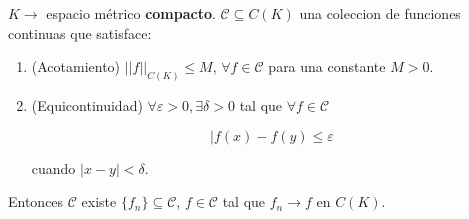 \begin{ftheorem}
   $K\rightarrow$ espacio métrico \textbf{compacto}. $\mathcal{C}\subseteq C(K)$ una coleccion de funciones continuas que satisface:

   \begin{enumerate}
      \item (Acotamiento) $||f||_{C(K)}\leq M$, $\forall f\in \mathcal{C}$ para una constante $M>0$.
      \item (Equicontinuidad) $\forall \varepsilon>0,\exists \delta>0$ tal que $\forall f\in\mathcal{C}$ 

      \[|f(x)-f(y)\leq \varepsilon\]

      cuando $|x-y|<\delta$.
   \end{enumerate}

   Entonces $\mathcal{C}$ existe $\{f_n\}\subseteq \mathcal{C}$, $f\in\mathcal{C}$ tal que $f_n\to f$ en $C(K)$.
\end{ftheorem}

